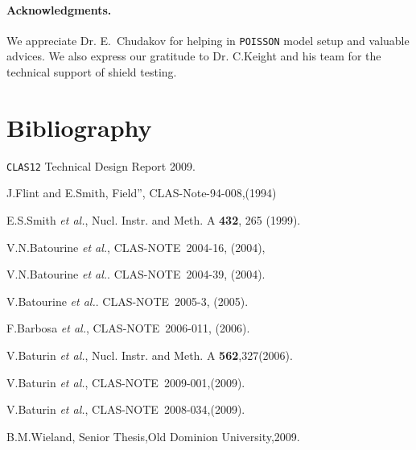\documentclass[12pt]{article}
\begin{document}
\paragraph{Acknowledgments.}We appreciate Dr. E.~Chudakov for helping in   
{\tt POISSON} model setup  and valuable advices. 
We also express our gratitude to Dr. C.Keight and his 
team for the  technical  support of  shield testing.


\section{Bibliography}
%
\begin{thebibliography}{99}

{\tt CLAS12} Technical Design Report 2009.

J.Flint and E.Smith,%
Field'', CLAS-Note-94-008,(1994)

E.S.Smith {\it et al.},%
Nucl. Instr. and Meth. A {\bf 432}, 265 (1999).

V.N.Batourine {\it et al.}, %
CLAS-NOTE~2004-16, (2004),

V.N.Batourine {\it et al.}. %
CLAS-NOTE~2004-39, (2004).

V.Batourine {\it et al.}.%
CLAS-NOTE~2005-3, (2005).

F.Barbosa {\it et al.},%
CLAS-NOTE~2006-011, (2006).

V.Baturin {\it et al.},%
Nucl. Instr. and Meth. A {\bf 562},327(2006).

V.Baturin {\it et al.},%
CLAS-NOTE~2009-001,(2009).


V.Baturin {\it et al.},%
CLAS-NOTE~2008-034,(2009).

B.M.Wieland,%
Senior Thesis,Old Dominion University,2009.

\end{thebibliography}
\end{document}
